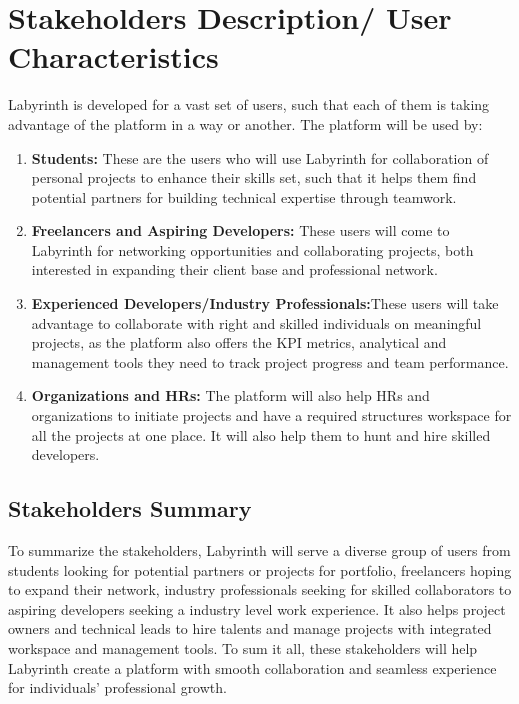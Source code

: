 \documentclass{FastFyp}
\begin{document}
\section{Stakeholders Description/ User Characteristics}
Labyrinth is developed for a vast set of users, such that each of them is taking advantage of the platform in a way or another. The platform will be used by:
\begin{enumerate}
    \item \textbf{Students:} These are the users who will use Labyrinth for collaboration of personal projects to enhance their skills set, such that it helps them find potential partners for building technical expertise through teamwork. 
    \item \textbf{Freelancers and Aspiring Developers:} These users will come to Labyrinth for networking opportunities and collaborating projects, both interested in expanding their client base and professional network.
    \item \textbf{Experienced Developers/Industry Professionals:}These users will take advantage to collaborate with right and skilled individuals on meaningful projects, as the platform also offers the KPI metrics, analytical and management tools they need to track project progress and team performance. 
    \item \textbf{Organizations and HRs:} The platform will also help HRs and organizations to initiate projects and have a required structures workspace for all the projects at one place. It will also help them to hunt and hire skilled developers.
\end{enumerate}
\subsection{Stakeholders Summary}
To summarize the stakeholders, Labyrinth will serve a diverse group of users from students looking for potential partners or projects for portfolio, freelancers hoping to expand their network, industry professionals seeking for skilled collaborators to aspiring developers seeking a industry level work experience. It also helps project owners and technical leads to hire talents and manage projects with integrated workspace and management tools. To sum it all, these stakeholders will help Labyrinth create a platform with smooth collaboration and seamless experience for individuals' professional growth.  
\end{document}
